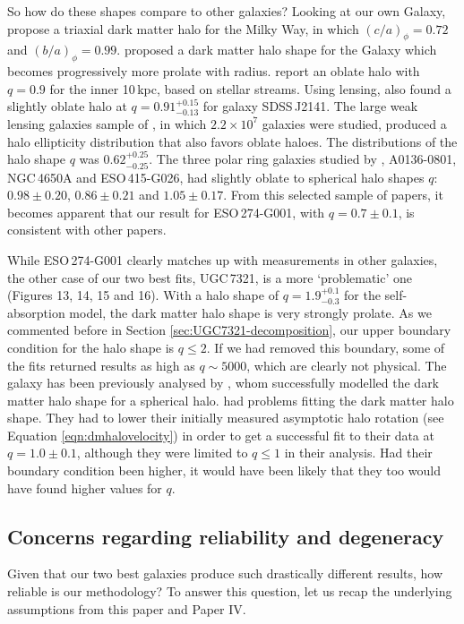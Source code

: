 \documentclass[useAMS,usenatbib]{mn2e}
\begin{document}
So how do these shapes compare to other galaxies?
Looking at our own Galaxy, \citet{Law2010A} propose a triaxial dark matter 
halo for the Milky Way, in which $(c/a)_\phi=0.72$ and $(b/a)_\phi=0.99$. 
\citet{Banerjee2011A} proposed a dark matter halo shape for the Galaxy  
which becomes progressively more prolate with radius. 
 \citet{VeraCiro2013} report an oblate halo with $q=0.9$ for the inner 
10\,kpc, based on stellar streams.
Using lensing, \citet{Barnabe2012A} also found a slightly oblate halo at 
$q=0.91^{+0.15}_{-0.13}$ for galaxy SDSS\,J2141.
The large weak lensing galaxies sample of \citet{vanUitert2012}, in which 
$2.2\times10^7$ galaxies were studied, produced a halo ellipticity 
distribution that also favors oblate haloes. 
The distributions of the halo shape $q$ was $0.62^{+0.25}_{-0.25}$. 
The three polar ring galaxies studied by \citet{Whitmore1987A}, A0136-0801, 
NGC\,4650A and ESO\,415-G026, had slightly oblate to spherical halo shapes 
$q$: $0.98\pm0.20$, $0.86\pm0.21$ and $1.05\pm0.17$. 
From this selected sample of papers, it becomes apparent that our result for 
ESO\,274-G001, with $q=0.7\pm0.1$, is consistent with other papers. 

While ESO\,274-G001 clearly matches up with measurements in other galaxies, 
the other case of our two best fits, UGC\,7321, is a more `problematic' one 
(Figures 13, 14, 15 and 16). 
With a halo shape of  $q=1.9_{-0.3}^{+0.1}$ for the self-absorption model, the 
dark matter halo shape is very strongly prolate.
As we commented before in Section \ref{sec:UGC7321-decomposition}, our upper 
boundary condition for the halo shape is $q\leq2$. If we had removed this 
boundary, some of the fits returned results as high as $q\sim5000$, which 
are clearly not physical.
The galaxy has been previously analysed by \citet{Banerjee2010A}, whom 
successfully modelled the dark matter halo shape for a spherical halo.
\citet{OBrien2010D} had problems fitting the dark matter halo shape. 
They had to lower their initially measured asymptotic halo rotation (see 
Equation \ref{eqn:dmhalovelocity}) in order to get a successful fit to their 
data at $q=1.0\pm0.1$, although they were limited to $q\leq1$ in their analysis.
Had their boundary condition been higher, it would have been likely that they 
too would have found higher values for $q$.



\subsection{Concerns regarding reliability and degeneracy}
Given that our two best galaxies produce such drastically different results, 
how reliable is our methodology? 
To answer this question, let us recap the underlying assumptions from this 
paper and Paper IV.
\end{document}
